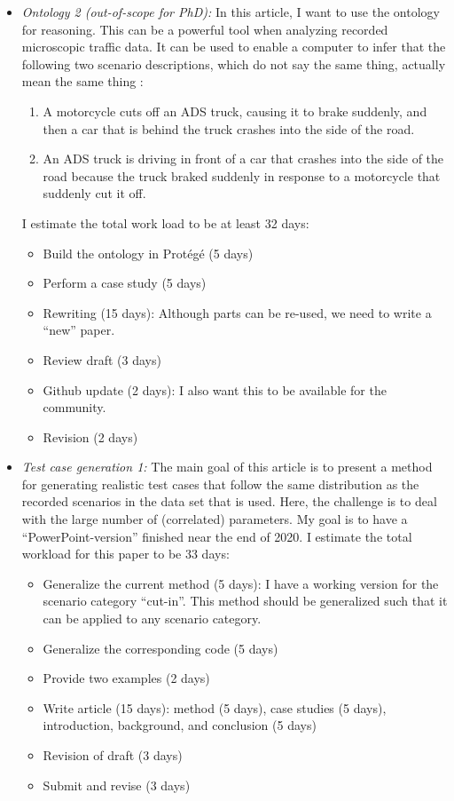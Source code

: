 \documentclass[10pt,final,a4paper,oneside,onecolumn]{article}
\begin{document}
\begin{itemize}
	\item \textit{Ontology 2 (out-of-scope for PhD):} In this article, I want to use the ontology for reasoning. This can be a powerful tool when analyzing recorded microscopic traffic data. It can be used to enable a computer to infer that the following two scenario descriptions, which do not say the same thing, actually mean the same thing \cite{OpenSCENARIO2}:
	\begin{enumerate}
		\item A motorcycle cuts off an ADS truck, causing it to brake suddenly, and then a car that is behind the truck crashes into the side of the road.
		\item An ADS truck is driving in front of a car that crashes into the side of the road because the truck braked suddenly in response to a motorcycle that suddenly cut it off.
	\end{enumerate}
	I estimate the total work load to be at least 32 days:
	\begin{itemize}
		\item Build the ontology in Prot{\'e}g{\'e} (5 days)
		\item Perform a case study (5 days)
		\item Rewriting (15 days): Although parts can be re-used, we need to write a ``new'' paper.
		\item Review draft (3 days)
		\item Github update (2 days): I also want this to be available for the community.
		\item Revision (2 days)
	\end{itemize}

	\item \textit{Test case generation 1:} The main goal of this article is to present a method for generating realistic test cases that follow the same distribution as the recorded scenarios in the data set that is used. Here, the challenge is to deal with the large number of (correlated) parameters. My goal is to have a ``PowerPoint-version'' finished near the end of 2020. I estimate the total workload for this paper to be 33 days:
	\begin{itemize}
		\item Generalize the current method (5 days): I have a working version for the scenario category ``cut-in''. This method should be generalized such that it can be applied to any scenario category.
		\item Generalize the corresponding code (5 days)
		\item Provide two examples (2 days)
		\item Write article (15 days): method (5 days), case studies (5 days), introduction, background, and conclusion (5 days)
		\item Revision of draft (3 days)
		\item Submit and revise (3 days)
	\end{itemize}
	

\end{itemize}
\end{document}
